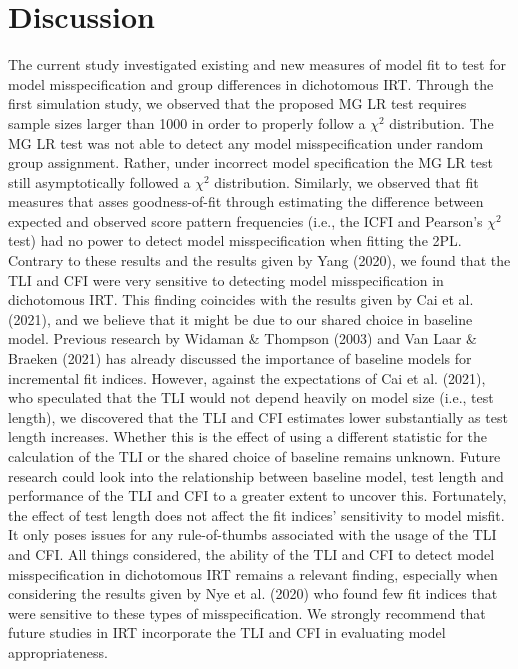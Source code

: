 \documentclass[Royal,sageapa,times,doublespace]{sagej}
\begin{document}
\section{Discussion}

The current study investigated existing and new measures of model fit to test for model misspecification and group differences in dichotomous IRT. Through the first simulation study, we observed that the proposed MG LR test requires sample sizes larger than 1000 in order to properly follow a $\chi^2$ distribution. The MG LR test was not able to detect any model misspecification under random group assignment. Rather, under incorrect model specification the MG LR test still asymptotically followed a $\chi^2$ distribution. Similarly, we observed that fit measures that asses goodness-of-fit through estimating the difference between expected and observed score pattern frequencies (i.e., the ICFI and Pearson's $\chi^2$ test) had no power to detect model misspecification when fitting the 2PL. \\
\indent Contrary to these results and the results given by Yang (2020), we found that the TLI and CFI were very sensitive to detecting model misspecification in dichotomous IRT. This finding coincides with the results given by Cai et al. (2021), and we believe that it might be due to our shared choice in baseline model. Previous research by Widaman \& Thompson (2003) and Van Laar \& Braeken (2021) has already discussed the importance of baseline models for incremental fit indices. However, against the expectations of Cai et al. (2021), who speculated that the TLI would not depend heavily on model size (i.e., test length), we discovered that the TLI and CFI estimates lower substantially as test length increases. Whether this is the effect of using a different statistic for the calculation of the TLI or the shared choice of baseline remains unknown. Future research could look into the relationship between baseline model, test length and performance of the TLI and CFI to a greater extent to uncover this. Fortunately, the effect of test length does not affect the fit indices' sensitivity to model misfit. It only poses issues for any rule-of-thumbs associated with the usage of the TLI and CFI. All things considered, the ability of the TLI and CFI to detect model misspecification in dichotomous IRT remains a relevant finding, especially when considering the results given by Nye et al. (2020) who found few fit indices that were sensitive to these types of misspecification. We strongly recommend that future studies in IRT incorporate the TLI and CFI in evaluating model appropriateness. \\
\end{document}
